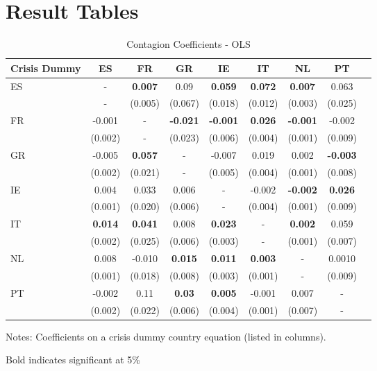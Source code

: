 \documentclass[/../base.tex]{subfiles}
\begin{document}
\section{Result Tables}
\label{a:tables}


\begin{table}[H]
	\centering
	\begin{threeparttable}
		\caption{Contagion Coefficients - OLS}
		\centering
		\begin{tabular}{p{1.5cm}*{8}{c}}
			\toprule
			\toprule
			Crisis Dummy & ES & FR & GR & IE & IT & NL & PT \\
			\midrule
			\multirow{2}{*}{ES} & - & \textbf{0.007} & 0.09 & \textbf{0.059} & \textbf{0.072} &\textbf{0.007}& 0.063 \\
			& - & (0.005) & (0.067) & (0.018) & (0.012) & (0.003) & (0.025) \\
			\multirow{2}{*}{FR} & -0.001 & - & \textbf{-0.021} & \textbf{-0.001} & \textbf{0.026} & \textbf{-0.001} & -0.002 \\
			& (0.002)& - & (0.023) & (0.006) & (0.004) & (0.001) & (0.009) \\
			\multirow{2}{*}{GR} & -0.005 & \textbf{0.057} & - & -0.007 & 0.019 & 0.002 & \textbf{-0.003} \\
			& (0.002) & (0.021) & - & (0.005) & (0.004) & (0.001) & (0.008)\\
			\multirow{2}{*}{IE} & 0.004 & 0.033 & 0.006 & - & -0.002 & \textbf{-0.002} & \textbf{0.026} \\
			& (0.001) & (0.020) & (0.006) & - & (0.004) & (0.001) & (0.009)\\
			\multirow{2}{*}{IT}  & \textbf{0.014} & \textbf{0.041} & 0.008 & \textbf{0.023} & - & \textbf{0.002} & 0.059 \\
			& (0.002) & (0.025) & (0.006) & (0.003) & - & (0.001) & (0.007)\\
			\multirow{2}{*}{NL} & 0.008 & -0.010 & \textbf{0.015} & \textbf{0.011} &\textbf{ 0.003} & - & 0.0010 \\
			& (0.001) & (0.018) & (0.008) & (0.003) & (0.001) & - & (0.009)\\
			\multirow{2}{*}{PT} & -0.002 & 0.11 & \textbf{0.03} & \textbf{0.005} & -0.001 & 0.007 & - \\
			& (0.002) & (0.022) & (0.006) & (0.004) & (0.001) & (0.007) & -\\           
			\bottomrule
			\bottomrule
		\end{tabular}
		\begin{tablenotes}
			\small
			\item Notes: Coefficients on a crisis dummy country equation (listed in columns). 
			\item Bold indicates significant at 5\%
		\end{tablenotes} 
		\label{tab:contagion_ols_a}
	\end{threeparttable}
\end{table}
\end{document}
